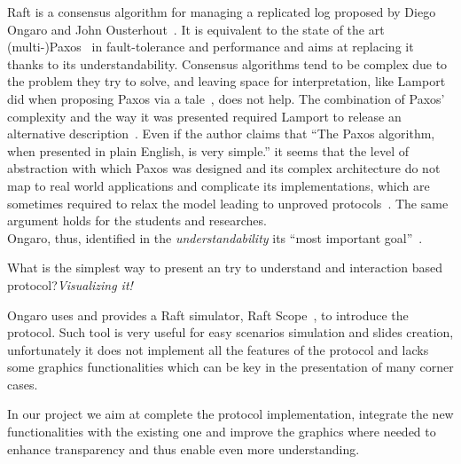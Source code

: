 Raft is a consensus algorithm for managing a replicated log
proposed by Diego Ongaro and John Ousterhout~\cite{ongaro2014search}.
It is equivalent to the state of the art (multi-)Paxos~\cite{lamport1998part} in fault-tolerance and performance and
aims at replacing it thanks to its understandability.
Consensus algorithms tend to be complex due to the problem they try to solve,
and leaving space for interpretation, like Lamport
did when proposing Paxos via a tale~\cite{lamport1998part}, does not help.
The combination of Paxos' complexity and the way it was presented required
Lamport to release an alternative description~\cite{lamport2001paxos}.
Even if the author claims that ``The Paxos algorithm, when presented in plain
English, is very simple.'' it seems that the level of abstraction
with which Paxos was designed and its complex architecture do not map
to real world applications and complicate its implementations, which are sometimes
required to relax the model leading to unproved protocols~\cite{chandra2007paxos}.
The same argument holds for the students and researches.\\
Ongaro, thus, identified in the \emph{understandability} its ``most important goal''~\cite{ongaro2014consensus}.

What is the simplest way to present an try to understand and interaction based
protocol?\emph{Visualizing it!}

Ongaro uses and provides a Raft simulator, Raft Scope~\cite{raftscope}, to introduce the protocol.
Such tool is very useful for easy scenarios simulation and slides creation,
unfortunately it does not implement all the features of the protocol and lacks
some graphics functionalities which can be key in the presentation of
many corner cases.

In our project we aim at complete the protocol implementation, integrate the new
functionalities with the existing one and improve the graphics where needed to
enhance transparency and thus enable even more understanding.
